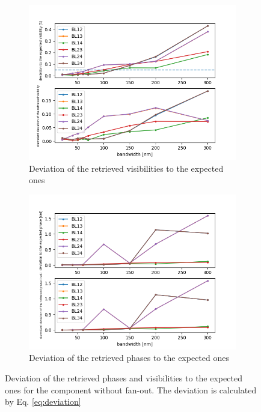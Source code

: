 \begin{figure}[htbp]
    \centering
    \begin{subfigure}{.45\textwidth}
        \includegraphics[scale=.45]{picture/retrieval_simu/visi_retrieved_nofan.png}
        \caption{Deviation of the retrieved visibilities to the expected ones}
    \end{subfigure}%
    \begin{subfigure}{.45\textwidth}
    \includegraphics[scale=.45]{picture/retrieval_simu/phase_retrieved_nofan.png}
    \caption{Deviation of the retrieved phases to the expected ones}
    \end{subfigure}
    \caption{Deviation of the retrieved phases and visibilities to the expected ones for the component without fan-out. The deviation is calculated by Eq. \ref{eq:deviation}}
    \label{fig:retrieved_nofan}
\end{figure}

